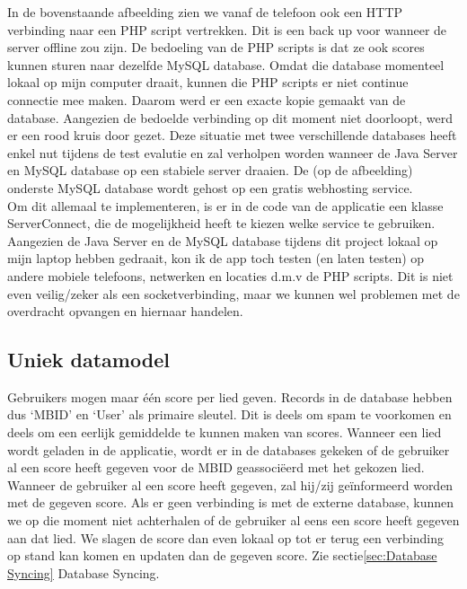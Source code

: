 \documentclass[11pt,a4paper]{article}
\begin{document}
	In de bovenstaande afbeelding zien we vanaf de telefoon ook een HTTP verbinding naar een PHP script vertrekken. Dit is een back up voor wanneer de server offline zou zijn. De bedoeling van de PHP scripts is dat ze ook scores kunnen sturen naar dezelfde MySQL database. Omdat die database momenteel lokaal op mijn computer draait, kunnen die PHP scripts er niet continue connectie mee maken. Daarom werd er een exacte kopie gemaakt van de database. Aangezien de bedoelde verbinding op dit moment niet doorloopt, werd er een rood kruis door gezet. Deze situatie met twee verschillende databases heeft enkel nut tijdens de test evalutie en zal verholpen worden wanneer de Java Server en MySQL database op een stabiele server draaien. De (op de afbeelding) onderste MySQL database wordt gehost op een gratis webhosting service. \\
	Om dit allemaal te implementeren, is er in de code van de applicatie een klasse ServerConnect, die de mogelijkheid heeft te kiezen welke service te gebruiken. Aangezien de Java Server en de MySQL database tijdens dit project lokaal op mijn laptop hebben gedraait, kon ik de app toch testen (en laten testen) op andere mobiele telefoons, netwerken en locaties d.m.v de PHP scripts. Dit is niet even veilig/zeker als een socketverbinding, maar we kunnen wel problemen met de overdracht opvangen en hiernaar handelen.


	\subsection{Uniek datamodel}
	\label{sec:Uniek datamodel}
	Gebruikers mogen maar één score per lied geven. Records in de database hebben dus `MBID' en `User' als primaire sleutel. Dit is deels om spam te voorkomen en deels om een eerlijk gemiddelde te kunnen maken van scores. Wanneer een lied wordt geladen in de applicatie, wordt er in de databases gekeken of de gebruiker al een score heeft gegeven voor de MBID geassociëerd met het gekozen lied. Wanneer de gebruiker al een score heeft gegeven, zal hij/zij geïnformeerd worden met de gegeven score. 
	Als er geen verbinding is met de externe database, kunnen we op die moment niet achterhalen of de gebruiker al eens een score heeft gegeven aan dat lied. We slagen de score dan even lokaal op tot er terug een verbinding op stand kan komen en updaten dan de gegeven score. Zie sectie\ref{sec:Database Syncing} Database Syncing.
	
\end{document}
